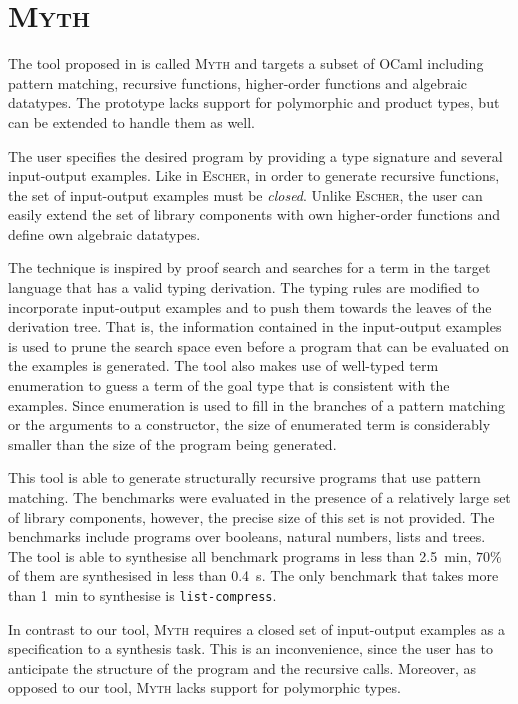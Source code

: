 \section{\mdseries\textsc{Myth}}

The tool proposed in \cite{MythPaper} is called \textsc{Myth} and targets a subset of OCaml including pattern matching, recursive functions, higher-order functions and algebraic datatypes. The prototype lacks support for polymorphic and product types, but can be extended to handle them as well.

The user specifies the desired program by providing a type signature and several input-output examples. Like in \textsc{Escher}, in order to generate recursive functions, the set of input-output examples must be \emph{closed}. Unlike \textsc{Escher}, the user can easily extend the set of library components with own higher-order functions and define own algebraic datatypes.

The technique is inspired by proof search and searches for a term in the target language that has a valid typing derivation. The typing rules are modified to incorporate input-output examples and to push them towards the leaves of the derivation tree. That is, the information contained in the input-output examples is used to prune the search space even before a program that can be evaluated on the examples is generated. The tool also makes use of well-typed term enumeration to guess a term of the goal type that is consistent with the examples. Since enumeration is used to fill in the branches of a pattern matching or the arguments to a constructor, the size of enumerated term is considerably smaller than the size of the program being generated.

This tool is able to generate structurally recursive programs that use pattern matching. The benchmarks were evaluated in the presence of a relatively large set of library components, however, the precise size of this set is not provided. The benchmarks include programs over booleans, natural numbers, lists and trees. The tool is able to synthesise all benchmark programs in less than \SI{2.5}{min}, $70\%$ of them are synthesised in less than \SI{0.4}{s}. The only benchmark that takes more than \SI{1}{min} to synthesise is \lstinline!list-compress!.

In contrast to our tool, \textsc{Myth} requires a closed set of input-output examples as a specification to a synthesis task. This is an inconvenience, since the user has to anticipate the structure of the program and the recursive calls. Moreover, as opposed to our tool, \textsc{Myth} lacks support for polymorphic types.

